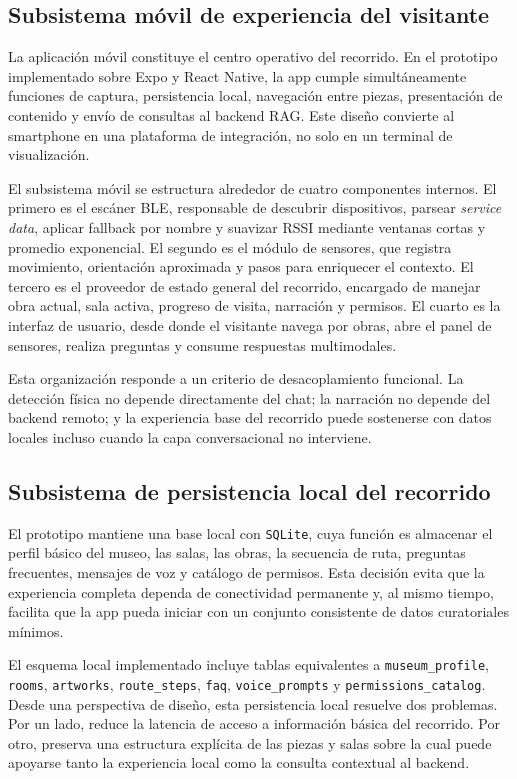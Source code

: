 \subsection{Subsistema móvil de experiencia del visitante}

La aplicación móvil constituye el centro operativo del recorrido. En el prototipo implementado sobre Expo y React Native, la app cumple simultáneamente funciones de captura, persistencia local, navegación entre piezas, presentación de contenido y envío de consultas al backend RAG. Este diseño convierte al smartphone en una plataforma de integración, no solo en un terminal de visualización.

El subsistema móvil se estructura alrededor de cuatro componentes internos. El primero es el escáner BLE, responsable de descubrir dispositivos, parsear \textit{service data}, aplicar fallback por nombre y suavizar RSSI mediante ventanas cortas y promedio exponencial. El segundo es el módulo de sensores, que registra movimiento, orientación aproximada y pasos para enriquecer el contexto. El tercero es el proveedor de estado general del recorrido, encargado de manejar obra actual, sala activa, progreso de visita, narración y permisos. El cuarto es la interfaz de usuario, desde donde el visitante navega por obras, abre el panel de sensores, realiza preguntas y consume respuestas multimodales.

Esta organización responde a un criterio de desacoplamiento funcional. La detección física no depende directamente del chat; la narración no depende del backend remoto; y la experiencia base del recorrido puede sostenerse con datos locales incluso cuando la capa conversacional no interviene.

\subsection{Subsistema de persistencia local del recorrido}

El prototipo mantiene una base local con \texttt{SQLite}, cuya función es almacenar el perfil básico del museo, las salas, las obras, la secuencia de ruta, preguntas frecuentes, mensajes de voz y catálogo de permisos. Esta decisión evita que la experiencia completa dependa de conectividad permanente y, al mismo tiempo, facilita que la app pueda iniciar con un conjunto consistente de datos curatoriales mínimos.

El esquema local implementado incluye tablas equivalentes a \texttt{museum\_profile}, \texttt{rooms}, \texttt{artworks}, \texttt{route\_steps}, \texttt{faq}, \texttt{voice\_prompts} y \texttt{permissions\_catalog}. Desde una perspectiva de diseño, esta persistencia local resuelve dos problemas. Por un lado, reduce la latencia de acceso a información básica del recorrido. Por otro, preserva una estructura explícita de las piezas y salas sobre la cual puede apoyarse tanto la experiencia local como la consulta contextual al backend.

